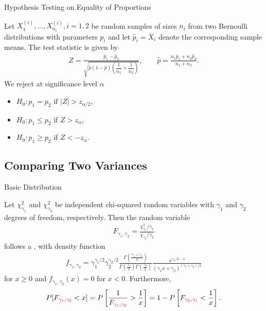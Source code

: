 \begin{frame}{Hypothesis Testing on Equality of Proportions}

\justifying
{} Let $X_1^{(i)}, \ldots, X_{n_i}^{(i)}, i = 1, 2$ be random samples of sizes $n_i$ from two Bernoulli distributions with parameters $p_i$ and let $\widehat{p}_i = \overline{X}_i$ denote the corresponding sample means. The test statistic is given by
\begin{align*}
Z = \frac{\widehat{p}_1 - \widehat{p}_2}{\sqrt{\widehat{p}(1-\widehat{p})\left(\dfrac{1}{n_1} + \dfrac{1}{n_2} \right)}}, \qquad \widehat{p} = \frac{n_1\widehat{p}_1 + n_2\widehat{p}_2}{n_1+n_2}.
\end{align*}
We reject at significance level $\alpha$
\begin{itemize}
	\item $H_0: p_1 = p_2$ if $|Z| > z_{\alpha/2}$,
	\item $H_0: p_1 \leq p_2$ if $Z > z_{\alpha}$,
	\item $H_0: p_1 \geq p_2$ if $Z < -z_{\alpha}$.
\end{itemize}

\end{frame}

\subsection{Comparing Two Variances}

\begin{frame}{Basic Distribution}

\justifying
{} Let $\chi_{\gamma_1}^2$ and $\chi_{\gamma_2}^2$ be independent chi-squared random variables with $\gamma_1$ and $\gamma_2$ degrees of freedom, respectively. Then the random variable 
\begin{align*}
F_{\gamma_1, \gamma_2} = \frac{\chi_{\gamma_1}^2/\gamma_1}{\chi_{\gamma_2}/\gamma_2}
\end{align*}
follows a , with density function
\begin{align*}
f_{\gamma_1, \gamma_2} = \gamma_1^{\gamma_1/2}\gamma_2^{\gamma_2/2} \frac{\Gamma\left(\frac{\gamma_1 + \gamma_2}{2} \right)}{\Gamma\left(\frac{\gamma_1}{2} \right)\Gamma\left(\frac{\gamma_2}{2} \right)} \frac{x^{\gamma_1/2-1}}{(\gamma_1 x + \gamma_2)^{(\gamma_1 + \gamma_2)/2}}
\end{align*}
for $x\geq 0$ and $f_{\gamma_1, \gamma_2}(x) = 0$ for $x < 0$. Furthermore,
\begin{align*}
P[F_{\red{\gamma_1, \gamma_2}} < x] = P\left[\frac{1}{F_{\red{\gamma_1, \gamma_2}}} > \frac{1}{x} \right] = 1 - P\left[F_{\red{\gamma_2,\gamma_1}} < \frac{1}{x} \right].
\end{align*}

\end{frame}

